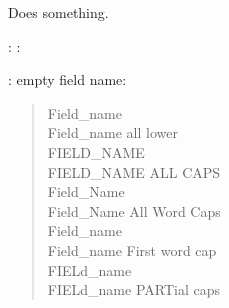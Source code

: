 \documentclass[letterpaper,10pt,english]{sphinxhowto}
\begin{document}
\begin{fulllineitems}
\label{objects:func_without_module}
Does something.

\end{fulllineitems}


\begin{fulllineitems}
\label{objects:func_without_body}
\end{fulllineitems}


\begin{fulllineitems}
\label{objects:func_with_unknown_field}
: :

: empty field name:
\begin{quote}\begin{description}
\item[{Field\_name}] \leavevmode
\item[{Field\_name all lower}] \leavevmode
\item[{FIELD\_NAME}] \leavevmode
\item[{FIELD\_NAME ALL CAPS}] \leavevmode
\item[{Field\_Name}] \leavevmode
\item[{Field\_Name All Word Caps}] \leavevmode
\item[{Field\_name}] \leavevmode
\item[{Field\_name First word cap}] \leavevmode
\item[{FIELd\_name}] \leavevmode
\item[{FIELd\_name PARTial caps}] \leavevmode
\end{description}\end{quote}

\end{fulllineitems}



\begin{fulllineitems}
\end{fulllineitems}


\begin{fulllineitems}
\label{objects:foolib.func_with_module}
\end{fulllineitems}
\end{document}
